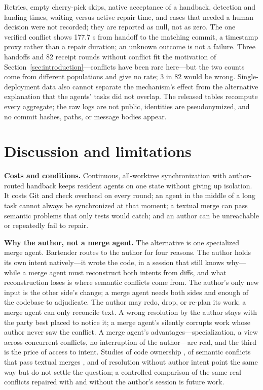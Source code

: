 \documentclass[pdflatex,sn-mathphys-ay]{sn-jnl}
\theoremstyle{thmstyleone}
\theoremstyle{thmstylethree}
\begin{document}
Retries, empty cherry-pick skips, native acceptance of a handback, detection and landing times, waiting versus active repair time, and cases that needed a human decision were not recorded; they are reported as null, not as zero. The one verified conflict shows 177.7 s from handoff to the matching commit, a timestamp proxy rather than a repair duration; an unknown outcome is not a failure. Three handoffs and 82 receipt rounds without conflict fit the motivation of Section~\ref{sec:introduction}---conflicts have been rare here---but the two counts come from different populations and give no rate; 3 in 82 would be wrong. Single-deployment data also cannot separate the mechanism's effect from the alternative explanation that the agents' tasks did not overlap. The released tables recompute every aggregate; the raw logs are not public, identities are pseudonymized, and no commit hashes, paths, or message bodies appear.
\section{Discussion and limitations}\label{sec:discussion}

\textbf{Costs and conditions.} Continuous, all-worktree synchronization with author-routed handback keeps resident agents on one state without giving up isolation. It costs Git and check overhead on every round; an agent in the middle of a long task cannot always be synchronized at that moment; a textual merge can pass semantic problems that only tests would catch; and an author can be unreachable or repeatedly fail to repair.

\textbf{Why the author, not a merge agent.} The alternative is one specialized merge agent. Bartender routes to the author for four reasons. The author holds its own intent natively---it wrote the code, in a session that still knows why---while a merge agent must reconstruct both intents from diffs, and what reconstruction loses is where semantic conflicts come from. The author's only new input is the other side's change; a merge agent needs both sides and enough of the codebase to adjudicate. The author may redo, drop, or re-plan its work; a merge agent can only reconcile text. A wrong resolution by the author stays with the party best placed to notice it; a merge agent's silently corrupts work whose author never saw the conflict. A merge agent's advantages---specialization, a view across concurrent conflicts, no interruption of the author---are real, and the third is the price of access to intent. Studies of code ownership \citep{bird2011-ownership}, of semantic conflicts that pass textual merges \citep{brun2011-conflicts}, and of resolution without author intent \citep{svyatkovskiy2022-transformers,dinella2023-deepmerge} point the same way but do not settle the question; a controlled comparison of the same real conflicts repaired with and without the author's session is future work.
\end{document}
